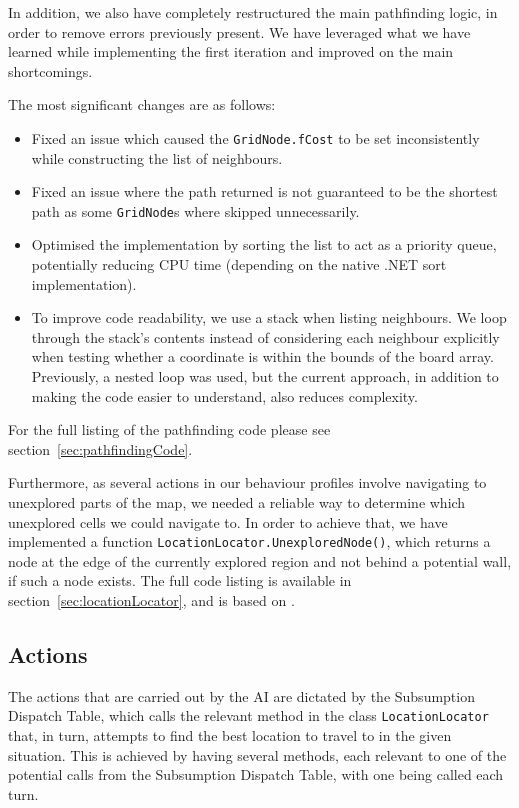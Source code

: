 \documentclass[11pt]{article}
\begin{document}
In addition, we also have completely restructured the main pathfinding logic, in order to remove errors previously present. We have leveraged what we have learned while implementing the first iteration\cite{theGloriousWe} and improved on the main shortcomings.

The most significant changes are as follows:

\begin{itemize}
\item Fixed an issue which caused the \verb|GridNode.fCost| to be set inconsistently while constructing the list of neighbours.
\item Fixed an issue where the path returned is not guaranteed to be the shortest path as some \verb|GridNode|s where skipped unnecessarily.
\item Optimised the implementation by sorting the list to act as a priority queue, potentially reducing CPU time (depending on the native .NET sort implementation).
\item To improve code readability, we use a stack when listing neighbours. We loop through the stack's contents instead of considering each neighbour explicitly when testing whether a coordinate is within the bounds of the board array. Previously, a nested loop was used, but the current approach, in addition to making the code easier to understand, also reduces complexity.
\end{itemize}

For the full listing of the pathfinding code please see section~\ref{sec:pathfindingCode}.

Furthermore, as several actions in our behaviour profiles involve navigating to unexplored parts of the map, we needed a reliable way to determine which unexplored cells we could navigate to. In order to achieve that, we have implemented a function \verb|LocationLocator.UnexploredNode()|, which returns a node at the edge of the currently explored region and not behind a potential wall, if such a node exists. The full code listing is available in section~\ref{sec:locationLocator}, and is based on \cite{denport}.

\subsection{Actions} \label{sec:actions}

The actions that are carried out by the AI are dictated by the Subsumption Dispatch Table, which calls the relevant method in the class \verb|LocationLocator| that, in turn, attempts to find the best location to travel to in the given situation. This is achieved by having several methods, each relevant to one of the potential calls from the Subsumption Dispatch Table, with one being called each turn.
\end{document}
